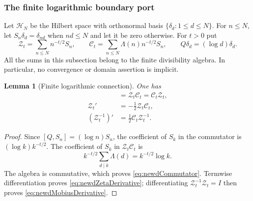 \documentclass[11pt]{amsart}
\newtheorem{lemma}[theorem]{Lemma}
\theoremstyle{definition}
\theoremstyle{remark}
\begin{document}
\subsubsection{The finite logarithmic boundary port}

Let $\mathcal H_N$ be the Hilbert space with orthonormal basis
$\{\delta_d:1\leq d\leq N\}$.  For $n\leq N$, let
$S_n\delta_d=\delta_{nd}$ when $nd\leq N$ and let it be zero otherwise.
For $t>0$ put
\begin{equation}\label{eq:newdZetaConnection}
 \mathscr Z_t=\sum_{n\leq N}n^{-t/2}S_n,
 \qquad
 \mathscr C_t=\sum_{n\leq N}\Lambda(n)n^{-t/2}S_n,
 \qquad Q\delta_d=(\log d)\delta_d.
\end{equation}
All the sums in this subsection belong to the finite divisibility algebra.
In particular, no convergence or domain assertion is implicit.

\begin{lemma}[Finite logarithmic connection]
\label{lem:newdFiniteConnection}
One has
\begin{align}
 [Q,\mathscr Z_t]&=\mathscr Z_t\mathscr C_t
                  =\mathscr C_t\mathscr Z_t,
                  \label{eq:newdCommutator}\\
 \mathscr Z_t'&=-\tfrac12\mathscr Z_t\mathscr C_t,
                  \label{eq:newdZetaDerivative}\\
 (\mathscr Z_t^{-1})'&=\tfrac12\mathscr C_t\mathscr Z_t^{-1}.
                  \label{eq:newdMobiusDerivative}
\end{align}
\end{lemma}

\begin{proof}
Since $[Q,S_n]=(\log n)S_n$, the coefficient of $S_k$ in the
commutator is $(\log k)k^{-t/2}$.  The coefficient of $S_k$ in
$\mathscr Z_t\mathscr C_t$ is
\[
 k^{-t/2}\sum_{d\mid k}\Lambda(d)=k^{-t/2}\log k.
\]
The algebra is commutative, which proves \eqref{eq:newdCommutator}.
Termwise differentiation proves \eqref{eq:newdZetaDerivative};
differentiating $\mathscr Z_t^{-1}\mathscr Z_t=I$ then proves
\eqref{eq:newdMobiusDerivative}.
\end{proof}
\end{document}

